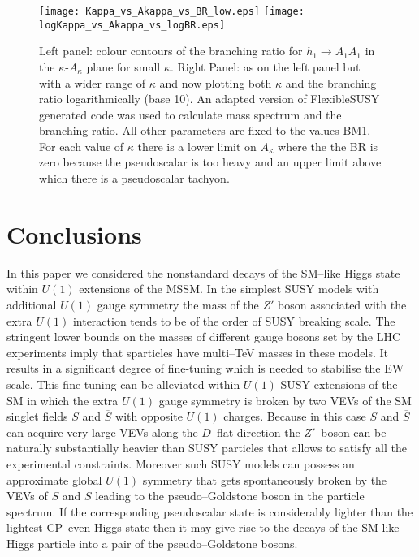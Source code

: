 \documentclass[12pt,a4paper]{article}
\begin{document}
\begin{figure}[h!]
\texttt{[image: Kappa\_vs\_Akappa\_vs\_BR\_low.eps]}
\texttt{[image: logKappa\_vs\_Akappa\_vs\_logBR.eps]}
\caption{Left panel: colour contours of the branching ratio for $h_1\rightarrow A_1 A_1$ in the  
$\kappa$-$A_\kappa$ plane for small $\kappa$. Right Panel: as on the left panel but with a wider 
range of $\kappa$ and now plotting  both $\kappa$ and the branching ratio logarithmically (base 10).  
An adapted version of FlexibleSUSY generated code was used to calculate mass spectrum and 
the branching ratio.  All other parameters are fixed to the values BM1.  For each value of $\kappa$ 
there is a lower limit on $A_\kappa$ where the the BR is zero because the pseudoscalar is too 
heavy and an upper limit above which there is a pseudoscalar tachyon.   }
\end{figure}



\section{Conclusions}

In this paper we considered the nonstandard decays of the SM--like Higgs state within $U(1)$ extensions
of the MSSM. In the simplest SUSY models with additional $U(1)$ gauge symmetry the mass of the $Z'$ boson
associated with the extra $U(1)$ interaction tends to be of the order of SUSY breaking scale. The stringent
lower bounds on the masses of different gauge bosons set by the LHC experiments imply that sparticles
have multi--TeV masses in these models. It results in a significant degree of fine-tuning which is needed
to stabilise the EW scale. This fine-tuning can be alleviated within $U(1)$ SUSY extensions of the SM
in which the extra $U(1)$ gauge symmetry is broken by two VEVs of the SM singlet fields $S$ and $\overline{S}$
with opposite $U(1)$ charges. Because in this case $S$ and $\overline{S}$ can acquire very large VEVs along
the $D$--flat direction the $Z'$--boson can be naturally substantially heavier than SUSY particles that
allows to satisfy all the experimental constraints. Moreover such SUSY models can possess an approximate
global $U(1)$ symmetry that gets spontaneously broken by the VEVs of $S$ and $\overline{S}$ leading
to the pseudo--Goldstone boson in the particle spectrum. If the corresponding pseudoscalar state is considerably
lighter than the lightest CP--even Higgs state then it may give rise to the decays of the SM-like Higgs particle
into a pair of the pseudo--Goldstone bosons.
\end{document}
